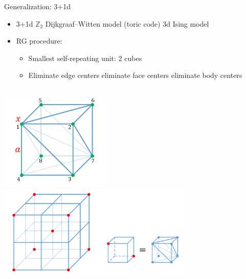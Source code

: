 \documentclass{fdubeamer}
\newcommand{\1}{\mathbb{1}}
\begin{document}
\begin{frame}{Generalization: 3+1d}

\begin{itemize}
  \item 3+1d $\mathbb{Z}_2$ Dijkgraaf--Witten model (toric code) \textrightarrow{} 3d Ising model
  \item RG procedure:

    \begin{itemize}
      \item Smallest self-repeating unit: 2 cubes
      \item Eliminate edge centers \textrightarrow{} eliminate face centers \textrightarrow{} eliminate body centers
    \end{itemize}
\end{itemize}

\begin{columns}[c]


    \centering
    \includegraphics[width=0.4\textwidth]{images/holographic/3+1d-cube-1.png} \\[1ex]
    \includegraphics[width=0.7\textwidth]{images/holographic/3+1d-cube-2.png}
    \vspace{-1em}



\end{columns}
\end{frame}
\end{document}
